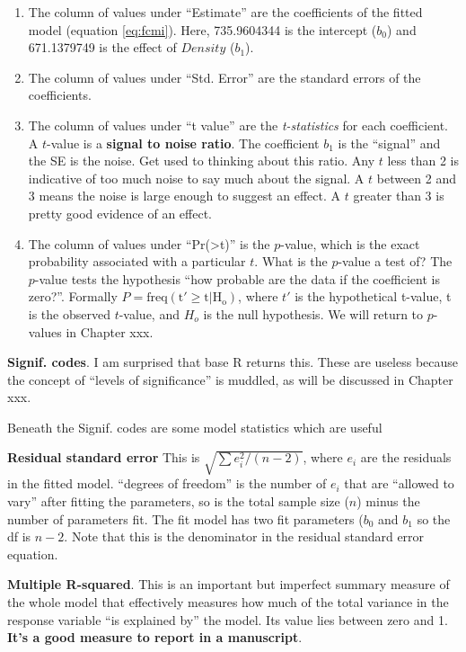\documentclass[]{book}
\providecommand{\tightlist}{%
  \setlength{\itemsep}{0pt}\setlength{\parskip}{0pt}}
\begin{document}
\begin{enumerate}
\def\labelenumi{\arabic{enumi}.}
\tightlist
\item
  The column of values under ``Estimate'' are the coefficients of the
  fitted model (equation \eqref{eq:fcmi}). Here, 735.9604344 is the
  intercept (\(b_0\)) and 671.1379749 is the effect of \(Density\)
  (\(b_1\)).
\item
  The column of values under ``Std. Error'' are the standard errors of
  the coefficients.
\item
  The column of values under ``t value'' are the \emph{t-statistics} for
  each coefficient. A \(t\)-value is a \textbf{signal to noise ratio}.
  The coefficient \(b_1\) is the ``signal'' and the SE is the noise. Get
  used to thinking about this ratio. Any \(t\) less than 2 is indicative
  of too much noise to say much about the signal. A \(t\) between 2 and
  3 means the noise is large enough to suggest an effect. A \(t\)
  greater than 3 is pretty good evidence of an effect.
\item
  The column of values under ``Pr(\textgreater{}\textbar{}t\textbar{})''
  is the \(p\)-value, which is the exact probability associated with a
  particular \(t\). What is the \(p\)-value a test of? The \(p\)-value
  tests the hypothesis ``how probable are the data if the coefficient is
  zero?''. Formally \(P = \mathrm{freq(t' \ge t|H_o)}\), where \(t'\) is
  the hypothetical t-value, t is the observed \(t\)-value, and \(H_o\)
  is the null hypothesis. We will return to \(p\)-values in Chapter xxx.
\end{enumerate}

\textbf{Signif. codes}. I am surprised that base R returns this. These
are useless because the concept of ``levels of significance'' is
muddled, as will be discussed in Chapter xxx.

Beneath the Signif. codes are some model statistics which are useful

\textbf{Residual standard error} This is \(\sqrt{\sum{e_i^2}/(n-2)}\),
where \(e_i\) are the residuals in the fitted model. ``degrees of
freedom'' is the number of \(e_i\) that are ``allowed to vary'' after
fitting the parameters, so is the total sample size (\(n\)) minus the
number of parameters fit. The fit model has two fit parameters (\(b_0\)
and \(b_1\) so the df is \(n-2\). Note that this is the denominator in
the residual standard error equation.

\textbf{Multiple R-squared}. This is an important but imperfect summary
measure of the whole model that effectively measures how much of the
total variance in the response variable ``is explained by'' the model.
Its value lies between zero and 1. \textbf{It's a good measure to report
in a manuscript}.
\end{document}
